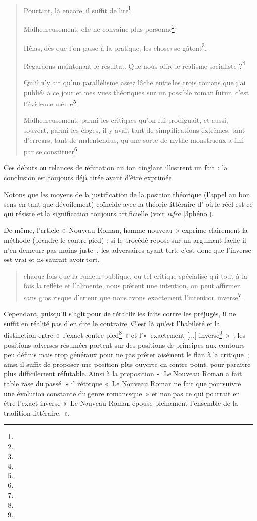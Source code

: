 \begin{quote}
    Pourtant, là encore, il suffit de lire\footnote{}


    Malheureusement, elle ne convainc plus personne\footnote{}


    Hélas, dès que l’on passe à la pratique, les choses se gâtent\footnote{}.

    Regardons maintenant le résultat. Que nous offre le réalisme socialiste ?\footnote{}

    Qu’il n’y ait qu’un parallélisme assez lâche entre les trois romans que j’ai publiés à ce jour et mes vues théoriques sur un possible roman futur, c’est l’évidence même\footnote{}.

    Malheureusement, parmi les critiques qu’on lui prodiguait, et aussi, souvent, parmi les éloges, il y avait tant de simplifications extrêmes, tant d’erreurs, tant de malentendus, qu’une sorte de mythe monstrueux a fini par se constituer\footnote{}
\end{quote}
Ces débuts ou relances de réfutation au ton cinglant illustrent un fait~: la conclusion est toujours déjà tirée avant d'être exprimée.

Notons que les moyens de la justification de la position théorique (l'appel au bon sens en tant que dévoilement) coïncide avec la théorie littéraire d'\robbe{} où le réel est ce qui résiste et la signification toujours artificielle (voir \textit{infra} \ref{3phéno}).

De même, l'article «~Nouveau Roman, homme nouveau~» exprime clairement la méthode (prendre le contre-pied) : si le procédé repose sur un argument facile il n'en demeure pas moins juste~, les adversaires ayant tort, c'est donc que l'inverse est vrai et \robbe{} ne saurait avoir tort. 
\begin{quote}
    chaque fois que la rumeur publique, ou tel critique spécialisé qui tout à la fois la reflète et l’alimente, nous prêtent une intention, on peut affirmer sans gros risque d’erreur que nous avons exactement l’intention inverse\footnote{}.
\end{quote}
Cependant, puisqu'il s'agit pour \robbe{} de rétablir les faits contre les préjugés, il ne suffit en réalité pas d'en dire le contraire. C'est là qu'est l'habileté et la distinction entre «~l'exact contre-pied\footnote{}~» et l'«~exactement [...] inverse\footnote{}~»~: les positions adverses résumées portent sur des positions de principes aux contours peu définis mais trop généraux pour ne pas prêter aisément le flan à la critique~; ainsi il suffit de proposer une position plus ouverte en contre point, pour paraître plus difficilement réfutable. Ainsi à la proposition «~Le Nouveau Roman a fait table rase du passé~» il rétorque «~Le Nouveau Roman ne fait que poursuivre une évolution constante du genre romanesque~» et non pas ce qui pourrait en être l'exact inverse «~Le Nouveau Roman épouse pleinement l'ensemble de la tradition littéraire.~».

